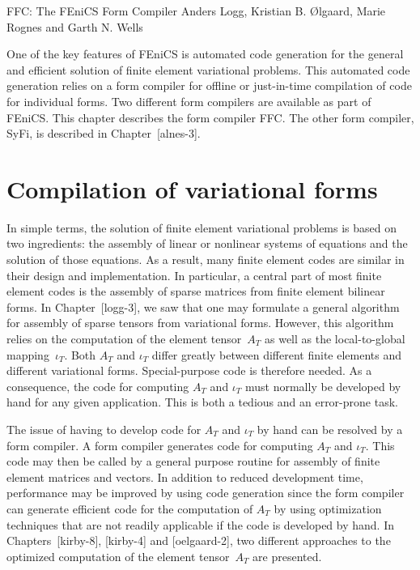               {FFC: The FEniCS Form Compiler}
              {Anders Logg, Kristian B. \O{}lgaard, Marie Rognes and Garth N. Wells}


\renewcommand{\dolfin}{DOLFIN}
\newcommand{\ferari}{FErari}
\newcommand{\pythonlang}{Python}
\newcommand{\commandline}[1]{\medskip\noindent\framebox[\textwidth][l]{\texttt{#1}}\medskip}

One of the key features of FEniCS is automated code generation for the
general and efficient solution of finite element variational
problems. This automated code generation relies on a form compiler for
offline or just-in-time compilation of code for individual forms. Two
different form compilers are available as part of FEniCS. This chapter
describes the form compiler FFC. The other form compiler, SyFi, is
described in Chapter~[alnes-3].

\section{Compilation of variational forms}

In simple terms, the solution of finite element variational problems
is based on two ingredients: the assembly of linear or nonlinear
systems of equations and the solution of those equations. As a result,
many finite element codes are similar in their design and
implementation. In particular, a central part of most finite element
codes is the assembly of sparse matrices from finite element bilinear
forms. In Chapter~[logg-3], we saw that one may formulate a general
algorithm for assembly of sparse tensors from variational
forms. However, this algorithm relies on the computation of the
element tensor~$A_T$ as well as the local-to-global mapping~$\iota_T$.
Both $A_T$ and $\iota_T$ differ greatly between different finite
elements and different variational forms. Special-purpose code is
therefore needed. As a consequence, the code for computing $A_T$ and
$\iota_T$ must normally be developed by hand for any given
application. This is both a tedious and an error-prone task.

The issue of having to develop code for $A_T$ and $\iota_T$ by hand
can be resolved by a form compiler. A form compiler generates code for
computing $A_T$ and $\iota_T$. This code may then be called by a
general purpose routine for assembly of finite element matrices and
vectors. In addition to reduced development time, performance may be
improved by using code generation since the form compiler can generate
efficient code for the computation of $A_T$ by using optimization
techniques that are not readily applicable if the code is developed by
hand. In Chapters~[kirby-8], [kirby-4] and [oelgaard-2], two different
approaches to the optimized computation of the element tensor~$A_T$
are presented.

